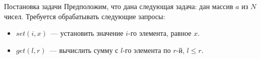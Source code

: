 
\begin{section}{Постановка задачи}
Предположим, что дана следующая задача: дан массив $a$ из $N$ чисел. Требуется 
обрабатывать следующие запросы:

\begin{itemize}

\item $set(i, x)$~--- установить значение $i$-го элемента, равное $x$.
\item $get(l, r)$~--- вычислить сумму с $l$-го элемента по $r$-й, $l \le r$.

\end{itemize}

\end{section}
